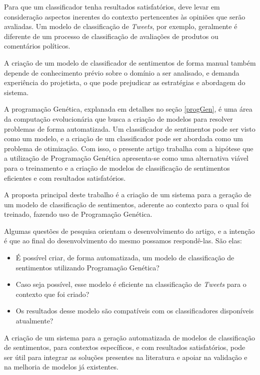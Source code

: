 \documentclass[12pt]{article}
\begin{document}
Para que um classificador tenha resultados satisfatórios, deve levar em consideração aspectos inerentes do contexto pertencentes às opiniões que serão avaliadas. Um modelo de classificação de \emph{Tweets}, por exemplo, geralmente é diferente de um processo de classificação de avaliações de produtos ou comentários políticos.

A criação de um modelo de classificador de sentimentos de forma manual também depende de conhecimento prévio sobre o domínio a ser analisado, e demanda experiência do projetista, o que pode prejudicar as estratégias e abordagem do sistema.


A programação Genética, explanada em detalhes no seção \ref{progGen}, é uma área da computação evolucionária que busca a criação de modelos para resolver problemas de forma automatizada. Um classificador de sentimentos pode ser visto como um modelo, e a criação de um classificador pode ser abordada como um problema de otimização. Com isso, o presente artigo trabalha com a hipótese que a utilização de Programação Genética apresenta-se como uma alternativa viável para o treinamento e a criação de modelos de classificação de sentimentos eficientes e com resultados satisfatórios.

A proposta principal deste trabalho é a criação de um sistema para a geração de um modelo de classificação de sentimentos, aderente ao contexto para o qual foi treinado, fazendo uso de Programação Genética. 

Algumas questões de pesquisa orientam o desenvolvimento do artigo, e a intenção é que ao final do desenvolvimento do mesmo possamos respondê-las. São elas:

\begin{itemize}
	\item{É possível criar, de forma automatizada, um modelo de classificação de sentimentos utilizando Programação Genética?}
	\item{Caso seja possível, esse modelo é eficiente na classificação de \emph{Tweets} para o contexto que foi criado?}
	\item{Os resultados desse modelo são compatíveis com os classificadores disponíveis atualmente?}
\end{itemize}


A criação de um sistema para a geração automatizada de modelos de classificação de sentimentos, para contextos específicos, e com resultados satisfatórios, pode ser útil para integrar as soluções presentes na literatura e apoiar na validação e na melhoria de modelos já existentes.
\end{document}
